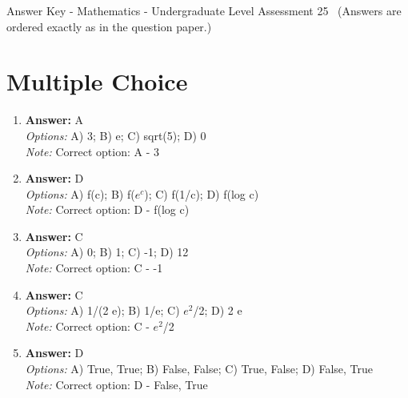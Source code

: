 \documentclass[12pt]{article}
\begin{document}
\begin{center}
Answer Key - Mathematics - Undergraduate Level Assessment 25 \
\small (Answers are ordered exactly as in the question paper.)
\end{center}

\section*{Multiple Choice}
\begin{enumerate}[label=\arabic*.]
\item \textbf{Answer:} A
\\ \textit{Options:} A) 3; B) e; C) sqrt(5); D) 0
\\ \textit{Note:} Correct option: A - 3
\item \textbf{Answer:} D
\\ \textit{Options:} A) f(c); B) f($e^c$); C) f(1/c); D) f(log c)
\\ \textit{Note:} Correct option: D - f(log c)
\item \textbf{Answer:} C
\\ \textit{Options:} A) 0; B) 1; C) -1; D) 12
\\ \textit{Note:} Correct option: C - -1
\item \textbf{Answer:} C
\\ \textit{Options:} A) 1/(2 e); B) 1/e; C) $e^2$/2; D) 2 e
\\ \textit{Note:} Correct option: C - $e^2$/2
\item \textbf{Answer:} D
\\ \textit{Options:} A) True, True; B) False, False; C) True, False; D) False, True
\\ \textit{Note:} Correct option: D - False, True
\end{enumerate}
\end{document}
